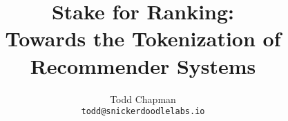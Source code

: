 \documentclass{article}
\title{Stake for Ranking: \\
Towards the Tokenization of Recommender Systems}
\author{
  Todd Chapman\\
  \texttt{todd@snickerdoodlelabs.io}
}
\begin{document}
\maketitle
\pagebreak

\tableofcontents{}
\pagebreak













\end{document}
